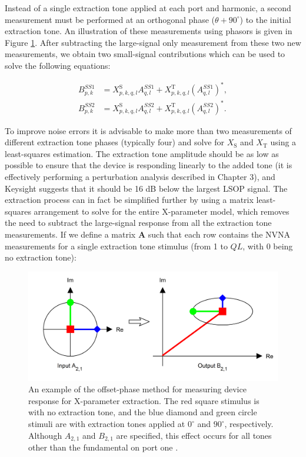 \documentclass[../thesis/thesis.tex]{subfiles}
\begin{document}
Instead of a single extraction tone applied at each port and harmonic, a second measurement must be performed at an orthogonal phase ($\theta+90^{\circ}$) to the initial extraction tone. An illustration of these measurements using phasors is given in Figure \ref{ch5_fig_extract}. After subtracting the large-signal only measurement from these two new measurements, we obtain two small-signal contributions which can be used to solve the following equations:

\begin{align}
	B^{SS1}_{p,k} &= X^\textrm{S}_{p,k,q,l}A^{SS1}_{q,l} + X^\textrm{T}_{p,k,q,l}(A^{SS1}_{q,l})^*, \\
	B^{SS2}_{p,k} &= X^\textrm{S}_{p,k,q,l}A^{SS2}_{q,l} + X^\textrm{T}_{p,k,q,l}(A^{SS2}_{q,l})^*.
\end{align}

To improve noise errors it is advisable to make more than two measurements of different extraction tone phases (typically four) and solve for $X_\textrm{S}$ and $X_\textrm{T}$ using a least-squares estimation. The extraction tone amplitude should be as low as possible to ensure that the device is responding linearly to the added tone (it is effectively performing a perturbation analysis described in Chapter 3), and Keysight suggests that it should be 16 dB below the largest LSOP signal. The extraction process can in fact be simplified further by using a matrix least-squares arrangement to solve for the entire X-parameter model, which removes the need to subtract the large-signal response from all the extraction tone measurements. If we define a matrix $\bm{A}$ such that each row contains the NVNA measurements for a single extraction tone stimulus (from 1 to $QL$, with 0 being no extraction tone):

\begin{figure}
	\centering
	\includegraphics[width=\textwidth]{extract}
	\caption[Offset-phase X-parameter extraction procedure.]{An example of the offset-phase method for measuring device response for X-parameter extraction. The red square stimulus is with no extraction tone, and the blue diamond and green circle stimuli are with extraction tones applied at $0^{\circ}$ and $90^{\circ}$, respectively. Although $A_{2,1}$ and $B_{2,1}$ are specified, this effect occurs for all tones other than the fundamental on port one \cite{Verspecht_2006}.}
	\label{ch5_fig_extract}
\end{figure}
\end{document}
